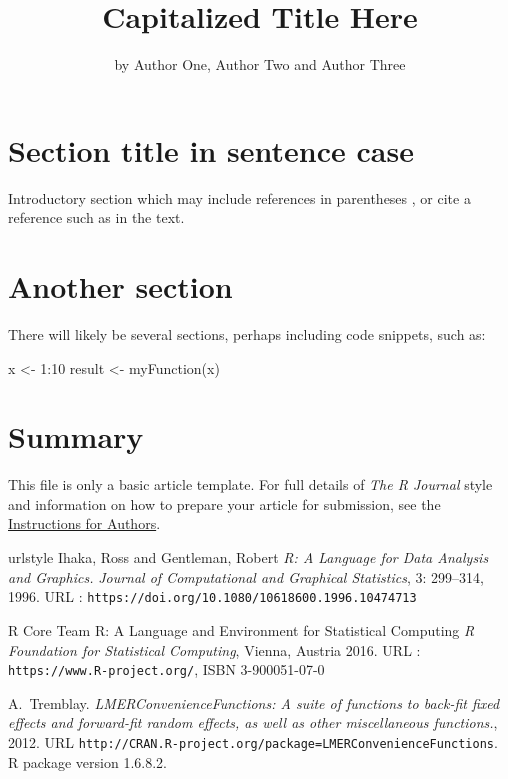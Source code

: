\title{Capitalized Title Here}
\author{by Author One, Author Two and Author Three}

\maketitle


\section{Section title in sentence case}

Introductory section which may include references in parentheses
\citep{R}, or cite a reference such as \citet{R} in the text.

\section{Another section}

There will likely be several sections, perhaps including code snippets, such as:

\begin{example}
  x <- 1:10
  result <- myFunction(x)
\end{example}

\section{Summary}

This file is only a basic article template. For full details of \emph{The R Journal} style and information on how to prepare your article for submission, see the \href{https://journal.r-project.org/share/author-guide.pdf}{Instructions for Authors}.


\begin{thebibliography}{20}
    \providecommand{\natexlab}[1]{#1}
    \providecommand{\url}[1]{\texttt{#1}}
    \expandafter\ifx\csname urlstyle\endcsname\relax
      \providecommand{\doi}[1]{doi: #1}\else
      \providecommand{\doi}{doi: \begingroup \urlstyle{rm}\Url}\fi
{}
Ihaka, Ross and Gentleman, Robert
\newblock \emph{R: A Language for Data Analysis and Graphics.}
\newblock \emph{Journal of Computational and Graphical Statistics}, 3:
299--314, 1996.
\newblock URL : \url{https://doi.org/10.1080/10618600.1996.10474713}

R Core Team
\newblock R: A Language and Environment for Statistical Computing
\newblock \emph{R Foundation for Statistical Computing}, Vienna, Austria  2016.
\newblock URL : \url{https://www.R-project.org/}, ISBN 3-900051-07-0

A.~Tremblay.
\newblock \emph{LMERConvenienceFunctions: A suite of functions to back-fit
  fixed effects and forward-fit random effects, as well as other miscellaneous
  functions.}, 2012.
\newblock URL \url{http://CRAN.R-project.org/package=LMERConvenienceFunctions}.
\newblock R package version 1.6.8.2.
\end{thebibliography}

